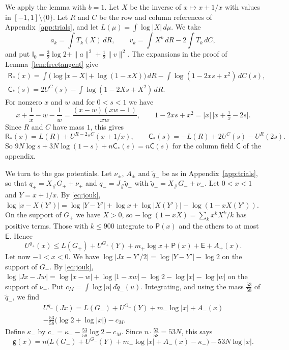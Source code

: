\documentclass[11pt]{amsart}
\theoremstyle{definition}
\theoremstyle{remark}
\numberwithin{equation}{section}
\begin{document}
We apply the lemma with $b=1$. Let $X$ be the inverse of $x\mapsto x+1/x$ with values in $[-1,1]\setminus\{0\}$. Let $R$ and $C$ be the row and column references of Appendix~\ref{app:trials},
and let $L(\mu)=\int\log|X|\,d\mu$. We take
\[
 a_k=\int T_k(X)\,dR,\qquad v_k=\int X^k\,dR-2\int T_k\,dC,
\]
and put $\mathsf I_0=\frac32\log2+\|a\|^2+\frac12\|v\|^2$. The expansions in the proof of Lemma~\ref{lem:freetangent} give
\begin{gather*}
 \mathsf R_*(x)=\int\bigl(\log|x-X|+\log(1-xX)\bigr)\,dR-\int\log(1-2xs+x^2)\,dC(s),\\
 \mathsf C_*(s)=2U^C(s)-\int\log(1-2Xs+X^2)\,dR.
\end{gather*}
For nonzero $x$ and $w$ and for $0<s<1$ we have
\begin{equation}\label{eq:jouk}
 x+\frac1x-w-\frac1w=\frac{(x-w)(xw-1)}{xw},\qquad 1-2xs+x^2=|x|\,\bigl|x+\tfrac1x-2s\bigr|.
\end{equation}
Since $R$ and $C$ have mass $1$, this gives
\[
 \mathsf R_*(x)=L(R)+U^{R-2_\#C}(x+1/x),\qquad \mathsf C_*(s)=-L(R)+2U^C(s)-U^R(2s).
\]
So $9N\log s+3N\log(1-s)+n\mathsf C_*(s)=n\mathsf C(s)$ for the column field $\mathsf C$ of the appendix.

We turn to the gas potentials. Let $\nu_\pm$, $A_\pm$ and $\tilde q_-$ be as in Appendix~\ref{app:trials}, so that $q_+=X_\#G_++\nu_+$ and $q_-=J_\#\tilde q_-$ with $\tilde q_-=X_\#G_-+\nu_-$.
Let $0<x<1$ and $Y=x+1/x$. By \eqref{eq:jouk}, $\log|x-X(Y')|=\log|Y-Y'|+\log x+\log|X(Y')|-\log(1-xX(Y'))$. On the support of $G_+$ we have $X>0$, so
$-\log(1-xX)=\sum_kx^kX^k/k$ has positive terms. Those with $k\le900$ integrate to $\mathsf P(x)$ and the others to at most $\mathsf E$. Hence
\begin{equation}\label{eq:qplus}
 U^{q_+}(x)\le L(G_+)+U^{G_+}(Y)+m_+\log x+\mathsf P(x)+\mathsf E+A_+(x).
\end{equation}
Let now $-1<x<0$. We have $\log|Jx-Y'/2|=\log|Y-Y'|-\log2$ on the support of $G_-$. By \eqref{eq:jouk},
$\log|Jx-Jw|=\log|x-w|+\log|1-xw|-\log2-\log|x|-\log|w|$ on the support of $\nu_-$. Put $c_M=\int\log|u|\,d\tilde q_-(u)$. Integrating, and using the mass $\frac{53}{58}$ of $\tilde q_-$, we find
\begin{multline}\label{eq:qminus}
 U^{q_-}(Jx)=L(G_-)+U^{G_-}(Y)+m_-\log|x|+A_-(x)\\
 -\tfrac{53}{58}\bigl(\log2+\log|x|\bigr)-c_M.
\end{multline}
Define $\kappa_-$ by $c_-=\kappa_--\frac{53}{58}\log2-c_M$. Since $n\cdot\frac{53}{58}=53N$, this says
\begin{equation}\label{eq:gneg}
 \mathsf g(x)=n\bigl(L(G_-)+U^{G_-}(Y)+m_-\log|x|+A_-(x)-\kappa_-\bigr)-53N\log|x|.
\end{equation}
\end{document}

